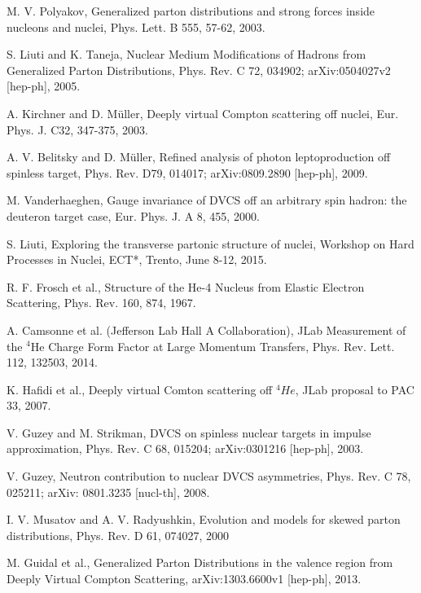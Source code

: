 
\begin{thebibliography}{99}



M. V. Polyakov, Generalized parton distributions and strong forces inside nucleons and nuclei, Phys. Lett. B 555, 57-62, 2003.

S. Liuti and K. Taneja, Nuclear Medium Modifications of Hadrons from Generalized Parton Distributions, Phys. Rev. C 72, 034902; arXiv:0504027v2 [hep-ph], 2005.

A. Kirchner and D. M{\"u}ller, Deeply virtual Compton scattering off nuclei, Eur. Phys. J. C32, 347-375, 2003. 

A. V. Belitsky and D. M{\"u}ller, Refined analysis of photon leptoproduction 
off spinless target, Phys. Rev. D79, 014017; arXiv:0809.2890 [hep-ph], 2009. 

M. Vanderhaeghen, Gauge invariance of DVCS off an arbitrary spin hadron: the deuteron target case, Eur. Phys. J. A 8, 455, 2000.

S. Liuti, Exploring the transverse partonic structure of nuclei, Workshop on Hard Processes in Nuclei, ECT*, Trento, June 8-12, 2015.


R. F. Frosch et al., Structure of the He-4 Nucleus from Elastic Electron Scattering, Phys. Rev. 160, 874, 1967.

A. Camsonne et al. (Jefferson Lab Hall A Collaboration), JLab Measurement of the $^4$He Charge Form Factor at Large Momentum Transfers, Phys. Rev. Lett. 112, 132503, 2014.

K. Hafidi et al., Deeply virtual Comton scattering off $^4He$, JLab proposal to PAC 33, 2007.

V. Guzey and M. Strikman, DVCS on spinless nuclear targets in impulse approximation, Phys. Rev. C 68, 015204; arXiv:0301216 [hep-ph], 2003.

V. Guzey, Neutron contribution to nuclear DVCS asymmetries, Phys. Rev. C 78, 025211; arXiv: 0801.3235 [nucl-th], 2008.

I. V. Musatov and A. V. Radyushkin, Evolution and models for skewed parton distributions, Phys. Rev. D 61, 074027, 2000


M. Guidal et al., Generalized Parton Distributions in the valence region from Deeply Virtual Compton Scattering, arXiv:1303.6600v1 [hep-ph], 2013.


\end{thebibliography}
